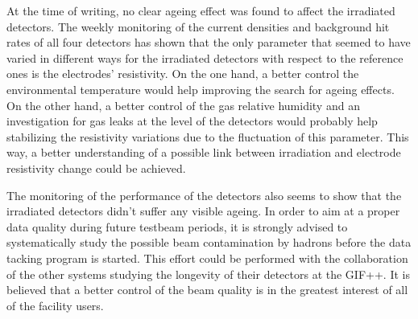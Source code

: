 	At the time of writing, no clear ageing effect was found to affect the irradiated detectors. The weekly monitoring of the current densities and background hit rates of all four detectors has shown that the only parameter that seemed to have varied in different ways for the irradiated detectors with respect to the reference ones is the electrodes' resistivity. On the one hand, a better control the environmental temperature would help improving the search for ageing effects. On the other hand, a better control of the gas relative humidity and an investigation for gas leaks at the level of the detectors would probably help stabilizing the resistivity variations due to the fluctuation of this parameter. This way, a better understanding of a possible link between irradiation and electrode resistivity change could be achieved.
	
	The monitoring of the performance of the detectors also seems to show that the irradiated detectors didn't suffer any visible ageing. In order to aim at a proper data quality during future testbeam periods, it is strongly advised to systematically study the possible beam contamination by hadrons before the data tacking program is started. This effort could be performed with the collaboration of the other systems studying the longevity of their detectors at the GIF++. It is believed that a better control of the beam quality is in the greatest interest of all of the facility users.

\clearpage{\pagestyle{empty}\cleardoublepage}
